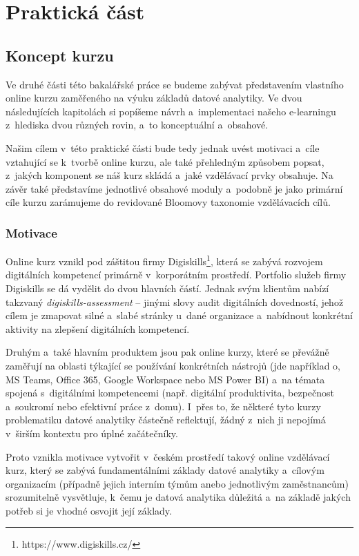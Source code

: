 \part{Praktická část}

\hypertarget{koncept-kurzu}{%
\chapter{Koncept kurzu}\label{koncept-kurzu}}

Ve druhé části této bakalářské práce se budeme zabývat představením vlastního online kurzu zaměřeného na výuku základů datové analytiky. Ve dvou následujících kapitolách si popíšeme návrh a~implementaci našeho e-learningu z~hlediska dvou různých rovin, a~to konceptuální a~obsahové.

Našim cílem v~této praktické části bude tedy jednak uvést motivaci a~cíle vztahující se k~tvorbě online kurzu, ale také přehledným způsobem popsat, z~jakých komponent se náš kurz skládá a~jaké vzdělávací prvky obsahuje. Na závěr také představíme jednotlivé obsahové moduly a~podobně je jako primární cíle kurzu zarámujeme do revidované Bloomovy taxonomie vzdělávacích cílů.

\hypertarget{motivace}{%
\section{Motivace}\label{motivace}}

Online kurz vznikl pod záštitou firmy Digiskills\footnote{https://www.digiskills.cz/}, která se zabývá rozvojem digitálních kompetencí primárně v~korporátním prostředí. Portfolio služeb firmy Digiskills se dá vydělit do dvou hlavních částí. Jednak svým klientům nabízí takzvaný \emph{digiskills-assessment} -- jinými slovy audit digitálních dovedností, jehož cílem je zmapovat silné a~slabé stránky u~dané organizace a~nabídnout konkrétní aktivity na zlepšení digitálních kompetencí.

Druhým a~také hlavním produktem jsou pak online kurzy, které se převážně zaměřují na oblasti týkající se používání konkrétních nástrojů (jde například o, MS Teams, Office 365, Google Workspace nebo MS Power BI) a~na témata spojená s~digitálními kompetencemi (např. digitální produktivita, bezpečnost a~soukromí nebo efektivní práce z~domu). I~přes to, že některé tyto kurzy problematiku datové analytiky částečně reflektují, žádný z~nich ji nepojímá v~širším kontextu pro úplné začátečníky.

Proto vznikla motivace vytvořit v~českém prostředí takový online vzdělávací kurz, který se zabývá fundamentálními základy datové analytiky a~cílovým organizacím (případně jejich interním týmům anebo jednotlivým zaměstnancům) srozumitelně vysvětluje, k~čemu je datová analytika důležitá a~na základě jakých potřeb si je vhodné osvojit její základy.

